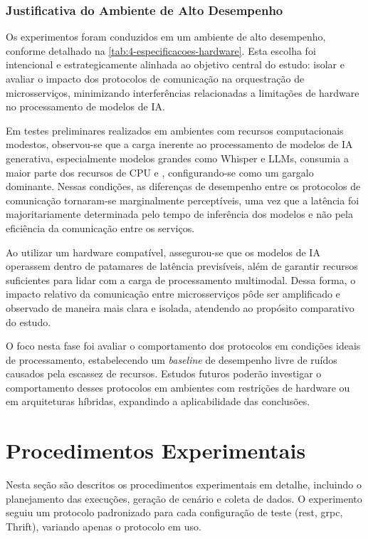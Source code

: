 \subsubsection{Justificativa do Ambiente de Alto Desempenho}
\label{subsec:justificativa-hardware}

Os experimentos foram conduzidos em um ambiente de alto desempenho, conforme detalhado na \autoref{tab:4-especificacoes-hardware}. Esta escolha foi intencional e estrategicamente alinhada ao objetivo central do estudo: isolar e avaliar o impacto dos protocolos de comunicação na orquestração de microsserviços, minimizando interferências relacionadas a limitações de hardware no processamento de modelos de IA.

Em testes preliminares realizados em ambientes com recursos computacionais modestos, observou-se que a carga inerente ao processamento de modelos de IA generativa, especialmente modelos grandes como Whisper e LLMs, consumia a maior parte dos recursos de CPU e , configurando-se como um gargalo dominante. Nessas condições, as diferenças de desempenho entre os protocolos de comunicação tornaram-se marginalmente perceptíveis, uma vez que a latência foi majoritariamente determinada pelo tempo de inferência dos modelos e não pela eficiência da comunicação entre os serviços.

Ao utilizar um hardware compatível, assegurou-se que os modelos de IA operassem dentro de patamares de latência previsíveis, além de garantir recursos suficientes para lidar com a carga de processamento multimodal. Dessa forma, o impacto relativo da comunicação entre microsserviços pôde ser amplificado e observado de maneira mais clara e isolada, atendendo ao propósito comparativo do estudo.

O foco nesta fase foi avaliar o comportamento dos protocolos em condições ideais de processamento, estabelecendo um \textit{baseline} de desempenho livre de ruídos causados pela escassez de recursos. Estudos futuros poderão investigar o comportamento desses protocolos em ambientes com restrições de hardware ou em arquiteturas híbridas, expandindo a aplicabilidade das conclusões.

\section{Procedimentos Experimentais}
\label{sec:4-procedimentos_experimentais}

Nesta seção são descritos os procedimentos experimentais em detalhe, incluindo o planejamento das execuções, geração de cenário e coleta de dados. O experimento seguiu um protocolo padronizado para cada configuração de teste (\gls{rest}, \gls{grpc}, Thrift), variando apenas o protocolo em uso.

